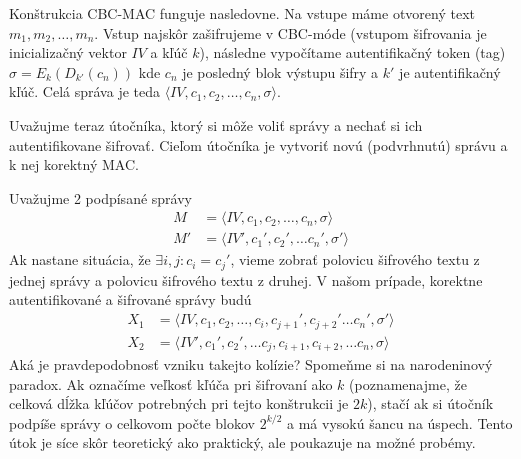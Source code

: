 \begin{priklad}
    Konštrukcia CBC-MAC funguje nasledovne. Na vstupe máme otvorený
    text $m_1,m_2,\dots,m_n$. Vstup najskôr zašifrujeme v CBC-móde
    (vstupom šifrovania je inicializačný vektor $IV$ a kľúč $k$),
    následne vypočítame autentifikačný token (tag)
    $\sigma=E_k(D_{k'}(c_n))$ kde $c_n$ je posledný blok výstupu
    šifry a $k'$ je autentifikačný kľúč.
    Celá správa je teda $\langle IV, c_1, c_2,\dots,c_n,\sigma
    \rangle$.

    Uvažujme teraz útočníka, ktorý si môže voliť správy a nechať si
    ich autentifikovane šifrovať. Cieľom útočníka je vytvoriť novú
    (podvrhnutú) správu a k nej korektný MAC.

    Uvažujme 2 podpísané správy
    \begin{align*}
        M &= \langle IV, c_1, c_2, \dots, c_n, \sigma \rangle \\
        M' &= \langle IV', c_1', c_2', \dots c_n', \sigma' \rangle
    \end{align*}
    Ak nastane situácia, že $\exists i,j: c_i = c_j'$, vieme zobrať
    polovicu šifrového textu z jednej správy a polovicu šifrového
    textu z druhej. V našom prípade, korektne autentifikované a
    šifrované správy budú
    \begin{align*}
        X_1 &= \langle IV, c_1, c_2, \dots, c_i, c_{j+1}', c_{j+2}' \dots
                c_n', \sigma' \rangle \\
        X_2 &= \langle IV', c_1', c_2', \dots c_j,
           c_{i+1}, c_{i+2}, \dots c_n, \sigma \rangle
    \end{align*}
    Aká je pravdepodobnosť vzniku takejto kolízie? Spomeňme si na
    narodeninový paradox. Ak označíme veľkosť kľúča pri šifrovaní ako 
    $k$ (poznamenajme, že celková dĺžka kľúčov potrebných pri tejto
    konštrukcii je $2k$),
    stačí ak si útočník podpíše správy o celkovom počte blokov
    $2^{k/2}$ a má vysokú šancu na úspech. Tento útok je síce skôr
    teoretický ako praktický, ale poukazuje na možné probémy.
\end{priklad}

